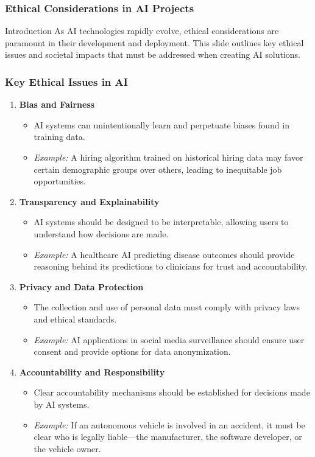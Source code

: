 \documentclass[aspectratio=169]{beamer}
\begin{document}
\begin{frame}[fragile]
    \frametitle{Ethical Considerations in AI Projects}
    \begin{block}{Introduction}
        As AI technologies rapidly evolve, ethical considerations are paramount in their development and deployment. This slide outlines key ethical issues and societal impacts that must be addressed when creating AI solutions.
    \end{block}
\end{frame}

\begin{frame}[fragile]
    \frametitle{Key Ethical Issues in AI}
    \begin{enumerate}
        \item \textbf{Bias and Fairness}
            \begin{itemize}
                \item AI systems can unintentionally learn and perpetuate biases found in training data.
                \item \textit{Example:} A hiring algorithm trained on historical hiring data may favor certain demographic groups over others, leading to inequitable job opportunities.
            \end{itemize}
        \item \textbf{Transparency and Explainability}
            \begin{itemize}
                \item AI systems should be designed to be interpretable, allowing users to understand how decisions are made.
                \item \textit{Example:} A healthcare AI predicting disease outcomes should provide reasoning behind its predictions to clinicians for trust and accountability.
            \end{itemize}
        \item \textbf{Privacy and Data Protection}
            \begin{itemize}
                \item The collection and use of personal data must comply with privacy laws and ethical standards.
                \item \textit{Example:} AI applications in social media surveillance should ensure user consent and provide options for data anonymization.
            \end{itemize}
        \item \textbf{Accountability and Responsibility}
            \begin{itemize}
                \item Clear accountability mechanisms should be established for decisions made by AI systems.
                \item \textit{Example:} If an autonomous vehicle is involved in an accident, it must be clear who is legally liable—the manufacturer, the software developer, or the vehicle owner.
            \end{itemize}
    \end{enumerate}
\end{frame}
\end{document}
